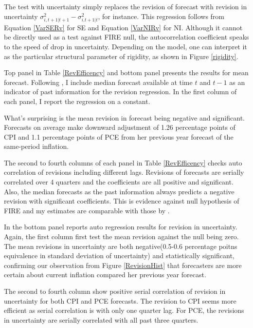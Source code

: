 \documentclass[]{article}
\begin{document}
	The test with uncertainty simply replaces the revision of forecast with revision in uncertainty $\sigma^2_{i,t+1|t+1} - \sigma^2_{i.t+1|t}$, for instance. This regression follows from Equation \ref{VarSERv} for SE and Equation \ref{VarNIRv} for NI. Although it  cannot be directly used as a test against FIRE null, the autocorrelation coefficient speaks to the speed of drop in uncertainty. Depending on the model, one can interpret it as the particular structural parameter of rigidity, as shown in Figure \ref{rigidity}. 
	
	Top panel in Table \ref{RevEfficency} and bottom panel presents the results for mean forecast. Following \citet{fuhrer2018intrinsic}, I include median forecast available at time $t$ and $t-1$ as an indicator of past information for the revision regression. In the first column of each panel, I report the regression on a constant. 
	
	What's surprising is the mean revision in forecast being negative and significant. Forecasts on average make downward adjustment of 1.26 percentage points of CPI and  1.1 percentage points of PCE from her previous year forecast of the same-period inflation. 
	
	The second to fourth columns of each panel in Table \ref{RevEfficency} checks auto correlation of revisions including different lags. Revisions of forecasts are serially correlated over 4 quarters and the coefficients are all positive and significant. Also, the median forecasts as the past information always predicts a negative revision with significant coefficients. This is evidence against null hypothesis of FIRE and my estimates are comparable with those by \citet{fuhrer2018intrinsic}. 
	
	In the bottom panel reports auto regression results for revision in uncertainty. Again, the first column first test the mean revision against the null being zero. The mean revisions in uncertainty are both negative(0.5-0.6 percentage poitns equivalence in standard deviation of uncertainty) and statistically significant, confirming our observation from Figure \ref{RevisionHist} that forecasters are more certain about current inflation compared her previous year forecast. 
	
	The second to fourth column show positive serial correlation of revision in uncertainty for both CPI and PCE forecasts. The revision to CPI seems more efficient as serial correlation is with only one quarter lag. For PCE, the revisions in uncertainty are serially correlated with all past three quarters. 
	
\end{document}
